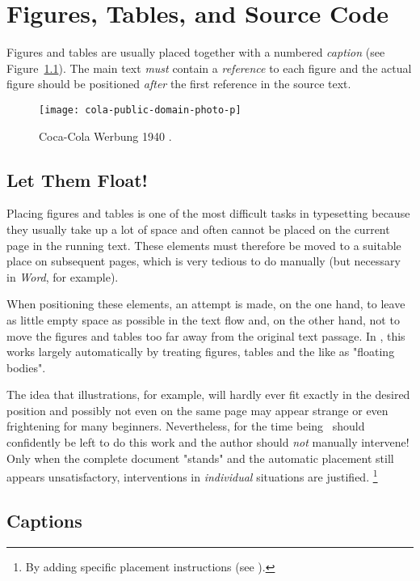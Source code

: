 \chapter{Figures, Tables, and Source Code}
\label{cha:Figures}


Figures and tables are usually placed together with a numbered \emph{caption}
(see Figure~\ref{fig:CocaCola}). The main text \emph{must} contain a
\emph{reference} to each figure and the actual figure should be positioned
\emph{after} the first reference in the \latex source text.

\begin{figure}
    \centering
    \texttt{[image: cola-public-domain-photo-p]}
    \caption{Coca-Cola Werbung 1940 \cite{CocaCola1940}.}
    \label{fig:CocaCola}
\end{figure}


\section{Let Them Float!}

Placing figures and tables is one of the most difficult tasks in typesetting
because they usually take up a lot of space and often cannot be placed on the
current page in the running text. These elements must therefore be moved to a
suitable place on subsequent pages, which is very tedious to do manually (but
necessary in \emph{Word}, for example).

When positioning these elements, an attempt is made, on the one hand, to
leave as little empty space as possible in the text flow and, on the other
hand, not to move the figures and tables too far away from the original text
passage. In \latex, this works largely automatically by treating figures,
tables and the like as "floating bodies".

The idea that illustrations, for example, will hardly ever fit exactly in the
desired position and possibly not even on the same page may appear strange or
even frightening for many beginners. Nevertheless, for the time being \latex\
should confidently be left to do this work and the author should \emph{not}
manually intervene! Only when the complete document "stands" and the
automatic placement still appears unsatisfactory, interventions in
\emph{individual} situations are justified.%
\footnote{By adding specific placement instructions (see
\cite[p.~39]{Oetiker2021}).}


\section{Captions}

